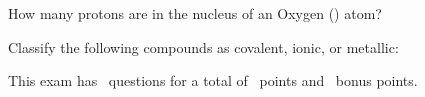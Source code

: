 \documentclass[11pt,addpoints]{exam}   	%
\begin{document}
\begin{questions}
\question[1] 
How many protons are in the nucleus of an Oxygen () atom?
\vspace{.2in}

\question
Classify the following compounds as covalent, ionic, or metallic:




\end{questions}

\vspace{2in}

\begin{center}
This exam has \numquestions\ questions for a total of \numpoints\ points and \numbonuspoints\ bonus points.
\end{center}

\begin{center}
\gradetable[v][questions]
\end{center}
\end{document}
